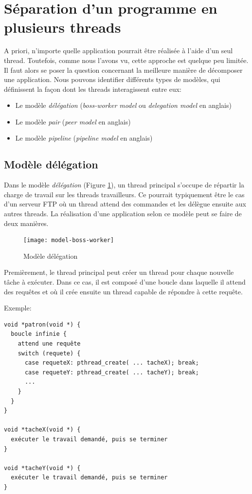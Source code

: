 \section{Séparation d'un programme en plusieurs threads}

A priori, n'importe quelle application pourrait être réalisée à l'aide d'un seul thread. Toutefois, comme nous l'avons vu, cette approche est quelque peu limitée. Il faut alors se poser la question concernant la meilleure manière de décomposer une application. Nous pouvons identifier différents types de modèles, qui définissent la façon dont les threads interagissent entre eux:

\begin{itemize}
  \item Le modèle \emph{délégation} (\emph{boss-worker model} ou \emph{delegation model} en anglais)
  \item Le modèle \emph{pair} (\emph{peer model} en anglais)
  \item Le modèle \emph{pipeline} (\emph{pipeline model} en anglais)
\end{itemize}

\subsection{Modèle délégation}

Dans le modèle \emph{délégation} (Figure \ref{fig:model-boss-worker}), un thread principal s'occupe de répartir la charge de travail sur les threads travailleurs. Ce pourrait typiquement être le cas d'un serveur FTP où un thread attend des commandes et les délègue ensuite aux autres threads. La réalisation d'une application selon ce modèle peut se faire de deux manières.


\begin{figure}[ht]
  \begin{center}
    \texttt{[image: model-boss-worker]}
    \caption{\label{fig:model-boss-worker}Modèle délégation}
  \end{center}
\end{figure}

Premièrement, le thread principal peut créer un thread pour chaque nouvelle tâche à exécuter. Dans ce cas, il est composé d'une boucle dans laquelle il attend des requêtes et où il crée ensuite un thread capable de répondre à cette requête.

\newpage

Exemple:

\begin{lstlisting}
void *patron(void *) {
  boucle infinie {
    attend une requête
    switch (requete) {
      case requeteX: pthread_create( ... tacheX); break;
      case requeteY: pthread_create( ... tacheY); break;
      ...
    }
  }
}

void *tacheX(void *) {
  exécuter le travail demandé, puis se terminer
}

void *tacheY(void *) {
  exécuter le travail demandé, puis se terminer
}
\end{lstlisting}

